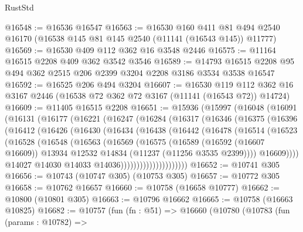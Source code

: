 \begin{lexlean}{RustStd}
\begin{coremodule}
@16548 := @16536 @16547
@16563 := @16530
    @160
    @411
    @81
    @494
    @2540
    @16170
    (@16538 @145 @81 @145 @2540 (@11141 (@16543 @145)) @11777)
@16569 := @16530 @409 @112 @362 @16 @3548 @2446
@16575 := @11164 @16515 @2208 @409 @362 @3542 @3546
@16589 := @14793 @16515 @2208 @95 @494 @362 @2515 @206 @2399 @3204 @2208 @3186 @3534 @3538 @16547
@16592 := @16525 @206 @494 @3204
@16607 := @16530
    @119
    @112
    @362
    @16
    @3167
    @2446
    (@16538 @72 @362 @72 @3167 (@11141 (@16543 @72)) @14724)
@16609 := @11405 @16515 @2208
@16651 := @15936
    (@15997
      (@16048
        (@16091
          (@16131
            (@16177
              (@16221
                (@16247
                  (@16284
                    (@16317
                      (@16346
                        (@16375
                          (@16396
                            (@16412
                              (@16426
                                (@16430
                                  (@16434
                                    (@16438
                                      (@16442
                                        (@16478
                                          (@16514
                                            (@16523
                                              (@16528
                                                (@16548
                                                  (@16563
                                                    (@16569
                                                      (@16575
                                                        (@16589
                                                          (@16592 (@16607 @16609))
                                                          @13934
                                                          @12532
                                                          @14834
                                                          (@11237 (@11256 @3535 @2399))))
                                                      @16609))))
                                              @14027
                                              @14030
                                              @14033
                                              @14036)))))))))))))))))))))
@16652 := @10741 @305
@16656 := @10743 (@10747 @305) (@10753 @305)
@16657 := @10772 @305
@16658 := @10762 @16657
@16660 := @10758 (@16658 @10777)
@16662 := @10800 (@10801 @305)
@16663 := @10796 @16662
@16665 := @10758 (@16663 @10825)
@16682 := @10757
    (fun (fn : @51) =>
    @16660
      (@10780
        (@10783
          (fun (params : @10782) =>

\end{coremodule}
\end{lexlean}
